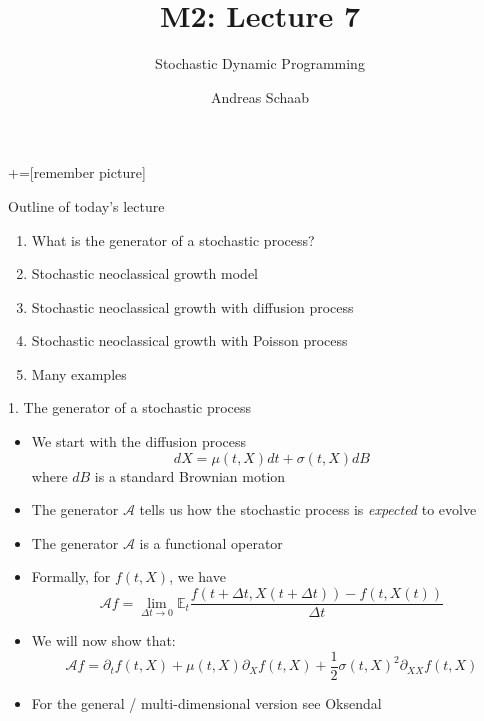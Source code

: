 \documentclass[10pt]{beamer}
\title{\large M2: Lecture 7}
\subtitle{Stochastic Dynamic Programming}
\author{Andreas Schaab}
\date{}
\begin{document}
+=[remember picture]
\thispagestyle{empty}
\maketitle 
\newpage

\addtocounter{framenumber}{-1}




\begin{frame}{Outline of today's lecture}
\addtocounter{framenumber}{-1}

\begin{enumerate}
\item What is the generator of a stochastic process?
\item Stochastic neoclassical growth model
\item Stochastic neoclassical growth with diffusion process
\item Stochastic neoclassical growth with Poisson process
\item Many examples
\end{enumerate}
\end{frame}



\begin{frame}{1. The generator of a stochastic process}
\begin{itemize}
\item We start with the diffusion process
\begin{equation*}
	dX = \mu(t, X) dt + \sigma (t, X) dB
\end{equation*}
where $dB$ is a standard Brownian motion

\item The generator $\mathcal A$ tells us how the stochastic process is \textit{expected} to evolve

\item The generator $\mathcal A$ is a functional operator

\item Formally, for $f(t, X)$, we have 
\begin{equation*}
	\mathcal A f = \lim_{\Delta t \to 0} \mathbb E_t \frac{ f(t + \Delta t, X(t + \Delta t)) - f(t, X(t)) }{\Delta t}
\end{equation*}

\item We will now show that:
\begin{equation*}
	\mathcal A f = \partial_t f(t, X) + \mu(t, X) \partial_X f(t, X) + \frac{1}{2} \sigma(t, X)^2 \partial_{XX} f(t, X)
\end{equation*}

\item For the general / multi-dimensional version see Oksendal
\end{itemize}
\end{frame}
\end{document}
